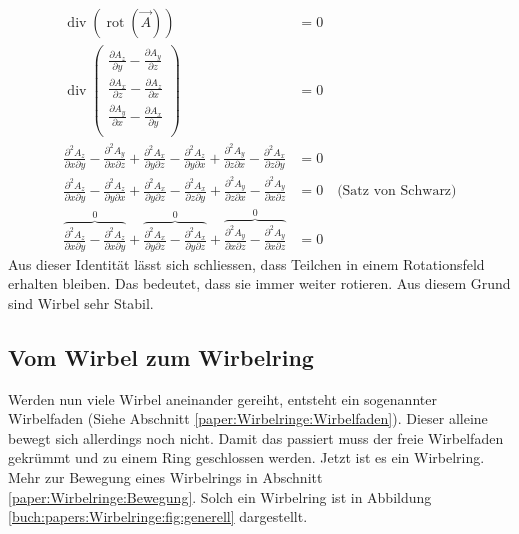 \begin{align*}
\operatorname{div} \left( \operatorname{rot} \left( \vec{A} \right) \right) 
&= 0\\
\operatorname{div}      
    \begin{pmatrix} 
        \frac{\partial A_z}{\partial y} - \frac{\partial A_y}{\partial z} \\ 
        \frac{\partial A_x}{\partial z} - \frac{\partial A_z}{\partial x} \\ 
        \frac{\partial A_y}{\partial x} - \frac{\partial A_x}{\partial y} \\ 
    \end{pmatrix} 
&= 0\\
\frac{\partial^2 A_z}{\partial x \partial y} - \frac{\partial^2 A_y}{\partial x \partial z} + 
\frac{\partial^2 A_x}{\partial y \partial z} - \frac{\partial^2 A_z}{\partial y \partial x} +
\frac{\partial^2 A_y}{\partial z \partial x} - \frac{\partial^2 A_x}{\partial z \partial y}
&= 0\\
\frac{\partial^2 A_z}{\partial x \partial y} - \frac{\partial^2 A_z}{\partial y \partial x} + 
\frac{\partial^2 A_x}{\partial y \partial z} - \frac{\partial^2 A_x}{\partial z \partial y} +
\frac{\partial^2 A_y}{\partial z \partial x} - \frac{\partial^2 A_y}{\partial x \partial z}
&= 0 \quad \text{(Satz von Schwarz)}\\
\overbrace{\frac{\partial^2 A_z}{\partial x \partial y} - \frac{\partial^2 A_z}{\partial x \partial y}}^0 + 
\overbrace{\frac{\partial^2 A_x}{\partial y \partial z} - \frac{\partial^2 A_x}{\partial y \partial z}}^0 +
\overbrace{\frac{\partial^2 A_y}{\partial x \partial z} - \frac{\partial^2 A_y}{\partial x \partial z}}^0
&= 0 
\end{align*}
Aus dieser Identität lässt sich schliessen, dass Teilchen in einem Rotationsfeld erhalten bleiben. 
Das bedeutet, dass sie immer weiter rotieren. 
Aus diesem Grund sind Wirbel sehr Stabil.

\subsection{Vom Wirbel zum Wirbelring}

Werden nun viele Wirbel aneinander gereiht, entsteht ein sogenannter Wirbelfaden (Siehe Abschnitt \ref{paper:Wirbelringe:Wirbelfaden}).
Dieser alleine bewegt sich allerdings noch nicht. 
Damit das passiert muss der freie Wirbelfaden gekrümmt und zu einem Ring geschlossen werden. 
Jetzt ist es ein Wirbelring.  
Mehr zur Bewegung eines Wirbelrings in Abschnitt \ref{paper:Wirbelringe:Bewegung}.
Solch ein Wirbelring ist in Abbildung \ref{buch:papers:Wirbelringe:fig:generell} dargestellt.
